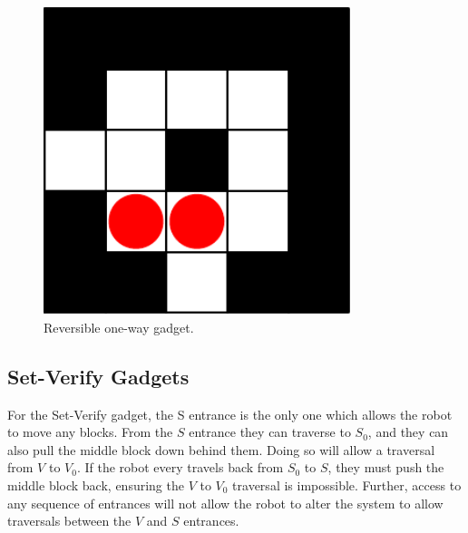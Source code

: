 \documentclass[11pt]{article}
\begin{document}
\begin{figure}[!ht]
  \centering
    \includegraphics[width=0.8\textwidth]{one_way}
    \caption{Reversible one-way gadget.}
    \label{ldeScreenshotsMap}
\end{figure}

\subsection{Set-Verify Gadgets}
For the Set-Verify gadget, the S entrance is the only one which allows the robot to move any blocks. From the $S$ entrance they can traverse to $S_0$, and they can also pull the middle block down behind them. Doing so will allow a traversal from $V$ to $V_0$. If the robot every travels back from $S_0$ to $S$, they must push the middle block back, ensuring the $V$ to $V_0$ traversal is impossible. Further, access to any sequence of entrances will not allow the robot to alter the system to allow traversals between the $V$ and $S$ entrances. \\
\end{document}
